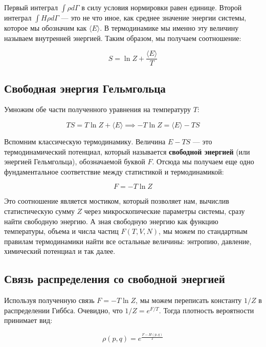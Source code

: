 \documentclass[../general/general]{subfiles}
\begin{document}
Первый интеграл $\int \rho d\Gamma$ в силу условия нормировки равен единице. Второй интеграл $\int H \rho d\Gamma$ — это не что иное, как среднее значение энергии системы, которое мы обозначим как $\langle E \rangle$. В термодинамике мы именно эту величину называем внутренней энергией. Таким образом, мы получаем соотношение:

\begin{equation}
S = \ln Z + \frac{\langle E \rangle}{T}
\end{equation}

\subsection{Свободная энергия Гельмгольца}

Умножим обе части полученного уравнения на температуру $T$:

\begin{equation}
TS = T \ln Z + \langle E \rangle \implies -T \ln Z = \langle E \rangle - TS
\end{equation}

Вспомним классическую термодинамику. Величина $E - TS$ — это термодинамический потенциал, который называется \textbf{свободной энергией} (или энергией Гельмгольца), обозначаемой буквой $F$. Отсюда мы получаем еще одно фундаментальное соответствие между статистикой и термодинамикой:

\begin{equation}
F = -T \ln Z
\end{equation}

Это соотношение является мостиком, который позволяет нам, вычислив статистическую сумму $Z$ через микроскопические параметры системы, сразу найти свободную энергию. А зная свободную энергию как функцию температуры, объема и числа частиц $F(T, V, N)$, мы можем по стандартным правилам термодинамики найти все остальные величины: энтропию, давление, химический потенциал и так далее.

\subsection{Связь распределения со свободной энергией}

Используя полученную связь $F = -T \ln Z$, мы можем переписать константу $1/Z$ в распределении Гиббса. Очевидно, что $1/Z = e^{F/T}$. Тогда плотность вероятности принимает вид:

\begin{equation}
\rho(p, q) = e^{\frac{F - H(p, q)}{T}}
\end{equation}
\end{document}
